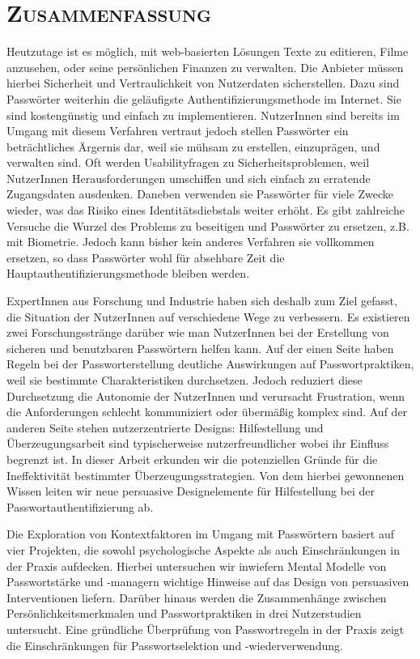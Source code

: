 \section*{\LARGE\rmfamily\bfseries\scshape{Zusammenfassung}}
Heutzutage ist es möglich, mit web-basierten Lösungen Texte zu editieren, Filme anzusehen, oder seine persönlichen Finanzen zu verwalten. Die Anbieter müssen hierbei Sicherheit und Vertraulichkeit von Nutzerdaten sicherstellen. Dazu sind Passwörter weiterhin die geläufigste Authentifizierungsmethode im Internet. Sie sind kostengünstig und einfach zu implementieren. NutzerInnen sind bereits im Umgang mit diesem Verfahren vertraut jedoch stellen Passwörter ein beträchtliches Ärgernis dar, weil sie mühsam zu erstellen, einzuprägen, und verwalten sind. Oft werden Usabilityfragen zu Sicherheitsproblemen, weil NutzerInnen Herausforderungen umschiffen und sich einfach zu erratende Zugangsdaten ausdenken. Daneben verwenden sie Passwörter für viele Zwecke wieder, was das Risiko eines Identitätsdiebstals weiter erhöht. Es gibt zahlreiche Versuche die Wurzel des Problems zu beseitigen und Passwörter zu ersetzen, z.B. mit Biometrie. Jedoch kann bisher kein anderes Verfahren sie vollkommen ersetzen, so dass Passwörter wohl für absehbare Zeit die Hauptauthentifizierungsmethode bleiben werden. 

ExpertInnen aus Forschung und Industrie haben sich deshalb zum Ziel gefasst, die Situation der NutzerInnen auf verschiedene Wege zu verbessern. Es existieren zwei Forschungsstränge darüber wie man NutzerInnen bei der Erstellung von sicheren und benutzbaren Passwörtern helfen kann. Auf der einen Seite haben Regeln bei der Passworterstellung deutliche Auswirkungen auf Passwortpraktiken, weil sie bestimmte Charakteristiken durchsetzen. Jedoch reduziert diese Durchsetzung die Autonomie der NutzerInnen und verursacht Frustration, wenn die Anforderungen schlecht kommuniziert oder übermäßig komplex sind. Auf der anderen Seite stehen nutzerzentrierte Designs: Hilfestellung und Überzeugungsarbeit sind typischerweise nutzerfreundlicher wobei ihr Einfluss begrenzt ist. In dieser Arbeit erkunden wir die potenziellen Gründe für die Ineffektivität bestimmter Überzeugungsstrategien. Von dem hierbei gewonnenen Wissen leiten wir neue persuasive Designelemente für Hilfestellung bei der Passwortauthentifizierung ab. 

Die Exploration von Kontextfaktoren im Umgang mit Passwörtern basiert auf vier Projekten, die sowohl psychologische Aspekte als auch Einschränkungen in der Praxis aufdecken. Hierbei untersuchen wir inwiefern Mental Modelle von Passwortstärke und -managern wichtige Hinweise auf das Design von persuasiven Interventionen liefern. Darüber hinaus werden die Zusammenhänge zwischen Persönlichkeitsmerkmalen und Passwortpraktiken in drei Nutzerstudien untersucht. Eine gründliche Überprüfung von Passwortregeln in der Praxis zeigt die Einschränkungen für Passwortselektion und -wiederverwendung. 

